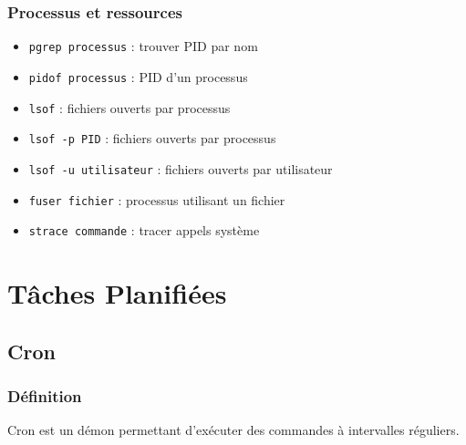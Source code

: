 \documentclass[12pt,a4paper]{article}
\begin{document}
\subsubsection{Processus et ressources}
\begin{itemize}
    \item \texttt{pgrep processus} : trouver PID par nom %
    \item \texttt{pidof processus} : PID d'un processus %
    \item \texttt{lsof} : fichiers ouverts par processus %
    \item \texttt{lsof -p PID} : fichiers ouverts par processus %
    \item \texttt{lsof -u utilisateur} : fichiers ouverts par utilisateur %
    \item \texttt{fuser fichier} : processus utilisant un fichier %
    \item \texttt{strace commande} : tracer appels syst\`eme %
\end{itemize}


\section{T\^aches Planifi\'ees}


\subsection{Cron}

\subsubsection{D\'efinition}
Cron est un d\'emon permettant d'ex\'ecuter des commandes \`a intervalles r\'eguliers.
\end{document}
